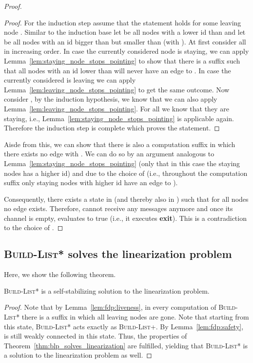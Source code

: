 \documentclass[a4paper,USenglish]{lipics}
\newcommand{\blp}{\textsc{Build-List+}\xspace}
\newcommand{\blpp}{\textsc{Build-List*}\xspace}
\newcommand{\nidec}{\xspace}
\begin{document}
\begin{proof}
\begin{proof}
For the induction step assume that the statement holds for some leaving node .
Similar to the induction base let   be all nodes with a lower id than  and let  be all nodes with an id bigger than  but smaller than  (with ).
At first consider all  in increasing order. 
In case the currently considered node  is staying, we can apply Lemma~\ref{lem:staying_node_stops_pointing} to show that there is a suffix such that all nodes with an id lower than  will never have an edge to .
In case the currently considered  is leaving we can apply Lemma~\ref{lem:leaving_node_stops_pointing} to get the same outcome.
Now consider , by the induction hypothesis, we know that we can also apply Lemma~\ref{lem:leaving_node_stops_pointing}.
For all  we know that they are staying, i.e., Lemma~\ref{lem:staying_node_stops_pointing} is applicable again.
Therefore the induction step is complete which proves the statement.
\end{proof}
Aisde from this, we can show that there is also a computation suffix in which there exists no edge  with .
We can do so by an argument analogous to Lemma~\ref{lem:staying_node_stops_pointing} (only that in this case the staying nodes has a higher id) and due to the choice of  (i.e., throughout the computation suffix  only staying nodes with higher id have an edge to ).

Consequently, there exists a state in  (and thereby also in ) such that for all nodes  no edge  exists. Therefore,  cannot receive any messages anymore and once its channel is empty, \nidec evaluates to true (i.e., it executes \textbf{exit}). This is a contradiction to the choice of .

 \end{proof}


\subsection{\blpp solves the linearization problem}
\label{sec:blpp_linearization_proof}
Here, we show the following theorem.

\begin{theorem}\label{thm:blpp_solves_linearization}
 \blpp is a self-stabilizing solution to the linearization problem.
\end{theorem}

\begin{proof}
Note that by Lemma~\ref{lem:fdp:liveness}, in every computation of \blpp there is a suffix in which all leaving nodes are gone.
Note that starting from this state, \blpp acts exactly as \blp.
By Lemma~\ref{lem:fdp:safety},  is still weakly connected in this state.
Thus, the properties of Theorem~\ref{thm:blp_solves_linearization} are fulfilled, yielding that \blpp is a solution to the linearization problem as well. 
\end{proof}
\end{document}
